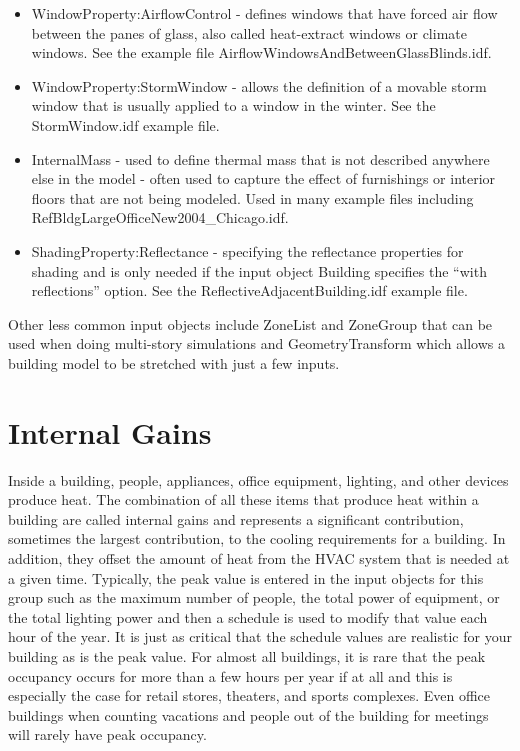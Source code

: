 \begin{itemize}
\item WindowProperty:AirflowControl - defines windows that have forced air
flow between the panes of glass, also called heat-extract windows
or climate windows. See the example file AirflowWindowsAndBetweenGlassBlinds.idf.
\item WindowProperty:StormWindow - allows the definition of a movable storm
window that is usually applied to a window in the winter. See the
StormWindow.idf example file.
\item InternalMass - used to define thermal mass that is not described anywhere
else in the model - often used to capture the effect of furnishings
or interior floors that are not being modeled. Used in many example
files including RefBldgLargeOfficeNew2004\_Chicago.idf.
\item ShadingProperty:Reflectance - specifying the reflectance properties
for shading and is only needed if the input object Building specifies
the ``with reflections'' option. See the ReflectiveAdjacentBuilding.idf
example file.
\end{itemize}
Other less common input objects include ZoneList and ZoneGroup that
can be used when doing multi-story simulations and GeometryTransform
which allows a building model to be stretched with just a few inputs.

\section{Internal Gains }

Inside a building, people, appliances, office equipment, lighting,
and other devices produce heat. The combination of all these items
that produce heat within a building are called internal gains and
represents a significant contribution, sometimes the largest contribution,
to the cooling requirements for a building. In addition, they offset
the amount of heat from the HVAC system that is needed at a given
time. Typically, the peak value is entered in the input objects for
this group such as the maximum number of people, the total power of
equipment, or the total lighting power and then a schedule is used
to modify that value each hour of the year. It is just as critical
that the schedule values are realistic for your building as is the
peak value. For almost all buildings, it is rare that the peak occupancy
occurs for more than a few hours per year if at all and this is especially
the case for retail stores, theaters, and sports complexes. Even office
buildings when counting vacations and people out of the building for
meetings will rarely have peak occupancy. 

